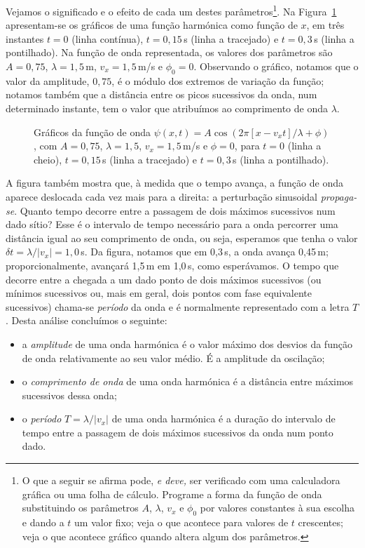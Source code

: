 Vejamos o significado e o efeito de cada um destes parâmetros\footnote{O que a
seguir se afirma pode, \emph{e deve,} ser verificado com uma calculadora
gráfica ou uma folha de cálculo. Programe a forma da função de onda
substituindo os parâmetros $A$, $\lambda$, $v_x$ e $\phi_0$ por valores
constantes à sua escolha e dando a $t$ um valor fixo; veja o que acontece para
valores de $t$ crescentes; veja o que acontece gráfico quando altera algum dos
parâmetros.}.
Na Figura~\ref{fig:20-050} apresentam\--se os gráficos de uma função harmónica
como função de $x$, em três instantes $t=0$ (linha contínua), $t=0,15$\,s (linha
a tracejado) e $t=0,3$\,s (linha a pontilhado). Na função de onda representada, os
valores dos parâmetros são $A=0,75$, $\lambda=1,5$\,m, $v_x=1,5$\,m/s e $\phi_0=0$.
Observando o gráfico, notamos que o valor da amplitude, $0,75$, é o módulo dos
extremos de variação da função; notamos também que a distância entre os picos
sucessivos da onda, num determinado instante, tem o valor que atribuímos ao
comprimento de onda $\lambda$.
\begin{figure}[htb]
{\centering
    \par
}
\caption{Gráficos da função de onda
$\psi(x,t)=A\cos(2\pi[x-v_xt]/\lambda+\phi)$, com $A=0,75$, $\lambda=1,5$,
$v_x=1,5$\,m/s e $\phi=0$, para $t=0$ (linha a cheio), $t=0,15$\,s (linha a
tracejado) e $t=0,3$\,s (linha a pontilhado).\label{fig:20-050}}
\end{figure}
A figura também mostra que, à medida que o tempo avança, a função de onda
aparece deslocada cada vez mais para a direita: a perturbação sinusoidal
\emph{propaga-se}. Quanto tempo decorre entre a passagem de dois máximos
sucessivos num dado sítio? Esse é o intervalo de tempo necessário para a onda
percorrer uma distância igual ao seu comprimento de onda, ou seja, esperamos que
tenha o valor $\delta t=\lambda/|v_x|=1,0$\,s. Da figura, notamos que em 0,3\,s,
a onda avança 0,45\,m; proporcionalmente, avançará 1,5\,m em 1,0\,s, como
esperávamos. O tempo que decorre entre a chegada a um dado ponto de dois máximos
sucessivos (ou mínimos sucessivos ou, mais em geral, dois pontos com fase
equivalente sucessivos) chama-se \emph{período} da onda e é normalmente
representado com a letra $T$.  Desta análise concluímos o seguinte:
\begin{itemize}
\item
    a \emph{amplitude} de uma onda harmónica é o valor máximo dos desvios da
    função de onda relativamente ao seu valor médio. É a amplitude da oscilação;
\item
    o \emph{comprimento de onda} de uma onda harmónica é a distância entre
    máximos sucessivos dessa onda;
\item
    o \emph{período} $T=\lambda/|v_x|$ de uma onda harmónica é a duração do
    intervalo de tempo entre a passagem de dois máximos sucessivos da onda num
    ponto dado.
\end{itemize}
